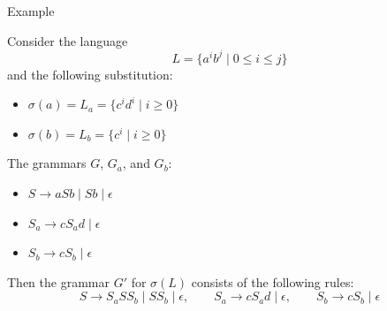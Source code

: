 \documentclass[handout]{beamer}
\begin{document}
\begin{frame}{Example}

    Consider the language
    $$
    L=\{a^ib^j\mid 0\leq i\leq j\}
    $$
    and the following substitution:
    \begin{itemize}
        \item $\sigma(a)=L_a=\{c^id^i\mid i\geq 0\}$
        \item $\sigma(b)=L_b=\{c^i\mid i\geq 0\}$
    \end{itemize}

    The grammars $G$, $G_a$, and $G_b$:
    \begin{itemize}
        \item $S\rightarrow aSb\mid Sb\mid\epsilon$\\
        \item $S_a\rightarrow c S_a d\mid\epsilon$
        \item $S_b\rightarrow c S_b\mid\epsilon$
    \end{itemize}
   
    Then the grammar $G'$ for $\sigma(L)$ consists of the following rules:
    $$
    S\rightarrow S_aSS_b\mid SS_b\mid\epsilon,\qquad S_a\rightarrow cS_ad\mid\epsilon,\qquad S_b\rightarrow cS_b\mid\epsilon
    $$

\end{frame}
\end{document}
